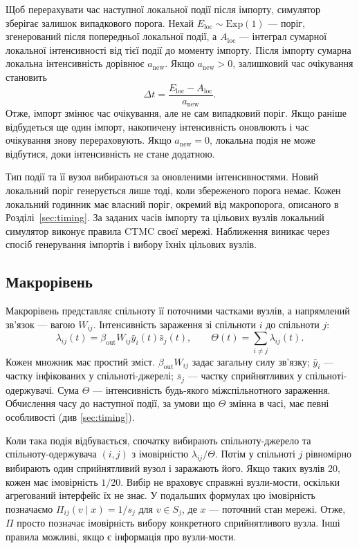 \documentclass[a4paper,fleqn]{cas-sc}
\newcommand{\ibar}{\bar{y}}
\newcommand{\sbar}{\bar{s}}
\begin{document}
Щоб перерахувати час наступної локальної події після імпорту, симулятор зберігає залишок випадкового порога. Нехай $E_{\mathrm{loc}}\sim\mathrm{Exp}(1)$ --- поріг,
згенерований після попередньої локальної події, а
$A_{\mathrm{loc}}$ --- інтеграл сумарної локальної
інтенсивності від тієї події до моменту імпорту.
Після імпорту сумарна локальна інтенсивність
дорівнює $a_{\mathrm{new}}$. Якщо $a_{\mathrm{new}}>0$,
залишковий час очікування становить
\[
\Delta t=
\frac{E_{\mathrm{loc}}-A_{\mathrm{loc}}}{a_{\mathrm{new}}}.
\]
Отже, імпорт змінює час очікування, але не сам випадковий
поріг. Якщо раніше відбудеться ще один імпорт, накопичену
інтенсивність оновлюють і час очікування знову
перераховують. Якщо $a_{\mathrm{new}}=0$, локальна подія
не може відбутися, доки інтенсивність не стане додатною.

Тип події та її вузол вибираються за оновленими інтенсивностями. Новий локальний поріг генерується лише тоді, коли збереженого порога немає. Кожен локальний годинник має власний поріг, окремий від макропорога, описаного в Розділі~\ref{sec:timing}. За заданих часів імпорту та цільових вузлів локальний симулятор виконує правила CTMC своєї мережі. Наближення виникає через спосіб генерування імпортів і вибору їхніх цільових вузлів.

\subsection{Макрорівень}
\label{sec:macro}

Макрорівень представляє спільноту її поточними частками вузлів, а напрямлений зв'язок --- вагою $W_{ij}$. Інтенсивність зараження зі спільноти $i$ до спільноти $j$:
\begin{equation}
\label{eq:macro_rate}
\lambda_{ij}(t)=\beta_{\mathrm{out}}W_{ij}\ibar_i(t)\sbar_j(t),
\qquad \Theta(t)=\sum_{i\neq j}\lambda_{ij}(t).
\end{equation}
Кожен множник має простий зміст. $\beta_{\mathrm{out}}W_{ij}$ задає загальну силу зв'язку; $\ibar_i$ --- частку інфікованих у спільноті-джерелі; $\sbar_j$ --- частку сприйнятливих у спільноті-одержувачі. Сума $\Theta$ --- інтенсивність будь-якого міжспільнотного зараження. Обчислення часу до наступної події, за умови що $\Theta$ змінна в часі, має певні особливості (див \ref{sec:timing}).

Коли така подія відбувається, спочатку вибирають спільноту-джерело та спільноту-одержувача $(i,j)$ з імовірністю $\lambda_{ij}/\Theta$. Потім у спільноті $j$ рівномірно вибирають один сприйнятливий вузол і заражають його. Якщо таких вузлів 20, кожен має імовірність $1/20$. Вибір не враховує справжні вузли-мости, оскільки агрегований інтерфейс їх не знає. У подальших формулах цю імовірність позначаємо $\Pi_{ij}(v\mid x)=1/s_j$ для $v\in S_j$, де $x$ --- поточний стан мережі. Отже, $\Pi$ просто позначає імовірність вибору конкретного сприйнятливого вузла. Інші правила можливі, якщо є інформація про вузли-мости. 
\end{document}
